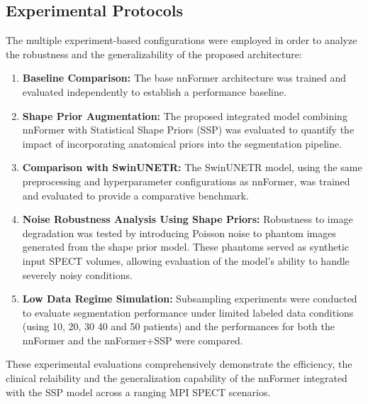 \subsection{Experimental Protocols}

The multiple experiment-based configurations were employed in order to analyze the robustness and the generalizability of the proposed architecture:

\begin{enumerate}
    \item \textbf{Baseline Comparison:} The base nnFormer architecture was trained and evaluated independently to establish a performance baseline.
    
    \item \textbf{Shape Prior Augmentation:} The proposed integrated model combining nnFormer with Statistical Shape Priors (SSP) was evaluated to quantify the impact of incorporating anatomical priors into the segmentation pipeline.
    
    \item \textbf{Comparison with SwinUNETR:} The SwinUNETR model, using the same preprocessing and hyperparameter configurations as nnFormer, was trained and evaluated to provide a comparative benchmark.
    
    \item \textbf{Noise Robustness Analysis Using Shape Priors:} Robustness to image degradation was tested by introducing Poisson noise to phantom images generated from the shape prior model. These phantoms served as synthetic input SPECT volumes, allowing evaluation of the model's ability to handle severely noisy conditions.

    \item \textbf{Low Data Regime Simulation:} Subsampling experiments were conducted to evaluate segmentation performance under limited labeled data conditions (using 10, 20, 30 40 and 50 patients) and the performances for both the nnFormer and the nnFormer+SSP were compared.

\end{enumerate}

These experimental evaluations comprehensively demonstrate the efficiency, the clinical relaibility and the generalization capability of the nnFormer integrated with the SSP model across a ranging MPI SPECT scenarios.

